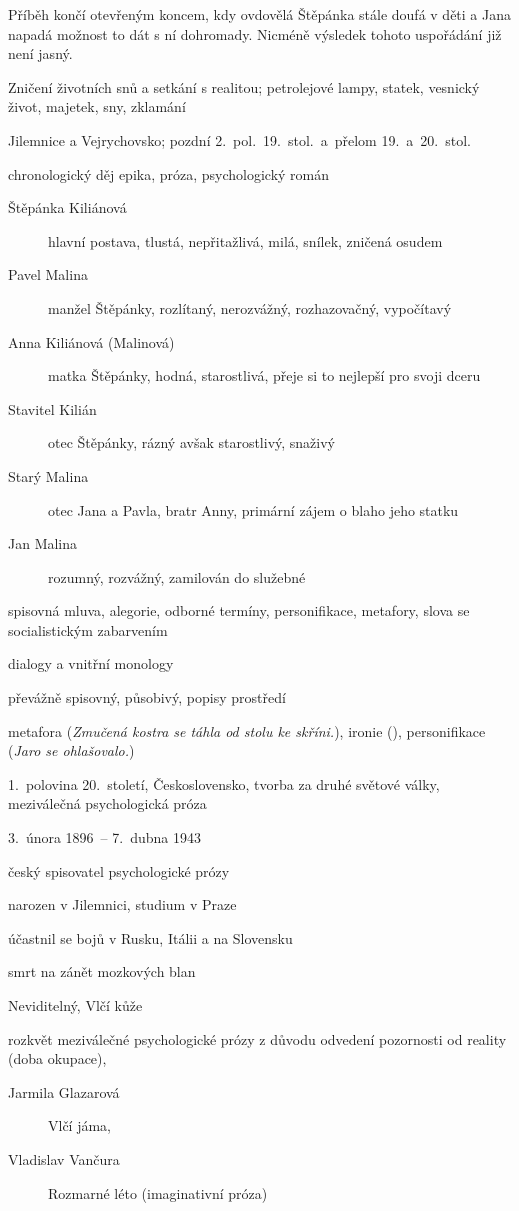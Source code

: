 Příběh končí otevřeným koncem, kdy ovdovělá Štěpánka stále doufá v děti a Jana
napadá možnost to dát s ní dohromady. Nicméně výsledek tohoto uspořádání již
není jasný.

 Zničení životních snů a setkání s realitou; petrolejové
lampy, statek, vesnický život, majetek, sny, zklamání

 Jilemnice a Vejrychovsko; pozdní 2.~pol.~19.~stol.~a~přelom
19.~a~20.~stol.

 chronologický děj
 epika, próza, psychologický román

\newpart

\begin{description}
	\item[Štěpánka Kiliánová] hlavní postava, tlustá, nepřitažlivá, milá,
		snílek, zničená osudem
	\item[Pavel Malina] manžel Štěpánky, rozlítaný, nerozvážný, rozhazovačný,
		vypočítavý
	\item[Anna Kiliánová (Malinová)] matka Štěpánky, hodná, starostlivá, přeje
		si to nejlepší pro svoji dceru
	\item[Stavitel Kilián] otec Štěpánky, rázný avšak starostlivý, snaživý
	\item[Starý Malina] otec Jana a Pavla, bratr Anny, primární zájem o blaho
		jeho statku
	\item[Jan Malina] rozumný, rozvážný, zamilován do služebné
\end{description}

spisovná mluva, alegorie, odborné termíny, personifikace, metafory,
slova se socialistickým zabarvením

 dialogy a vnitřní monology

\newpart

převážně spisovný, působivý, popisy prostředí

 metafora (\textit{Zmučená kostra se
táhla od stolu ke skříni.}), ironie (\textit{}), personifikace (\textit{Jaro se ohlašovalo.})

 1.~polovina 20.~století, Československo, tvorba
za druhé světové války, meziválečná psychologická próza

\begin{compactitem}
	\item 3.~února 1896~-- 7.~dubna 1943
	\item český spisovatel psychologické prózy
	\item narozen v Jilemnici, studium v Praze
	\item účastnil se bojů v Rusku, Itálii a na Slovensku
	\item smrt na zánět mozkových blan
	\item Neviditelný, Vlčí kůže
\end{compactitem}

rozkvět meziválečné psychologické prózy z důvodu odvedení pozornosti od reality (doba okupace),
\begin{description}
	\item[Jarmila Glazarová] Vlčí jáma,
	\item[Vladislav Vančura] Rozmarné léto (imaginativní próza)
\end{description}
